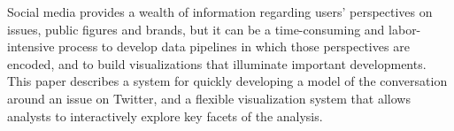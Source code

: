Social media provides a wealth of information regarding users' perspectives on issues, public figures and brands, but it can be a time-consuming and labor-intensive process to develop data pipelines in which those perspectives are encoded, and to build visualizations that illuminate important developments. This paper describes a system for quickly developing a model of the conversation around an issue on Twitter, and a flexible visualization system that allows analysts to interactively explore key facets of the analysis.
